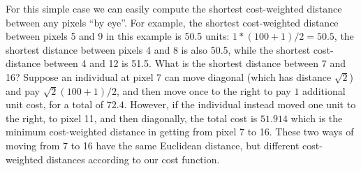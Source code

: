 For this simple case we
 can easily compute the shortest cost-weighted distance between any
pixels ``by eye''.  For example, the shortest cost-weighted distance between
pixels 5 and 9 in this example is 50.5 units: $1*(100+1)/2 = 50.5$,
the shortest distance between pixels 4 and 8 is also 50.5, while the
shortest cost-distance between 4 and 12 is 51.5.  What is the shortest
distance between 7 and 16? Suppose an individual at pixel 7 can move
diagonal (which has distance $\sqrt{2}$) and pay $\sqrt{2}(100+1)/2$,
and then move once to the right to pay $1$ additional unit cost, for a
total of $72.4$. However, if the individual instead moved one unit to
the right, to pixel 11, and then diagonally, the total cost is
$51.914$ which is the minimum cost-weighted distance in getting from
pixel 7 to 16. These two ways of moving from 7 to 16 have the same
Euclidean distance, but different cost-weighted distances according to
our cost function.

